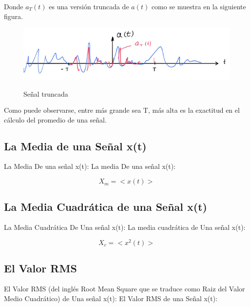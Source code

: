 Donde $a_{T}(t)$ es una versión truncada de $a(t)$ como se muestra en la siguiente figura.

\begin{figure}[h!]
	\captionsetup{justification = raggedright, singlelinecheck = false}
	\caption{Señal truncada} 
	\centering
	\includegraphics[scale=1]{Imagenes/Truncada.png}
	\label{fig:Truncada}
\end{figure}

Como puede observarse, entre más grande sea T, más alta es la exactitud en el cálculo del promedio de una señal.

\subsection{La Media de una Señal x(t)}

La Media De una señal x(t): La media De una señal x(t): 
 
 \begin{equation} \label{equ_veinticinco}
	 X_{m} = <x(t)> 
 \end{equation} 

\subsection{La Media Cuadrática de una Señal x(t)}
La Media Cuadrática De Una señal x(t): La media cuadrática de Una señal x(t):

 	\begin{equation} \label{equ_veintiseis}
		 X_{c} = <x^{2}(t)> 
	\end{equation}

\subsection{El Valor RMS}

El Valor RMS (del inglés Root Mean Square que se traduce como Raiz del Valor Medio Cuadrático)  de Una señal x(t): El Valor RMS de una Señal x(t):


